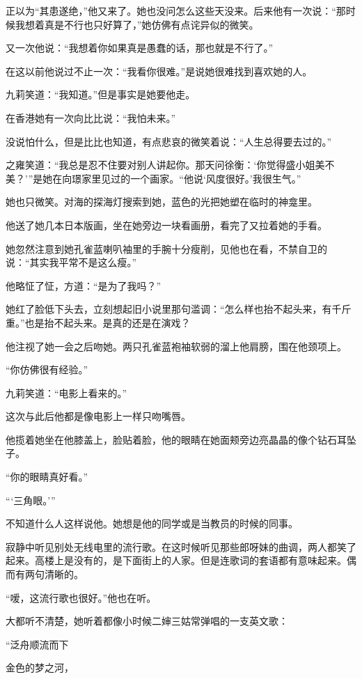 \par 正以为“其患遂绝，”他又来了。她也没问怎么这些天没来。后来他有一次说：“那时候我想着真是不行也只好算了，”她仿佛有点诧异似的微笑。
\par 又一次他说：“我想着你如果真是愚蠢的话，那也就是不行了。”
\par 在这以前他说过不止一次：“我看你很难。”是说她很难找到喜欢她的人。
\par 九莉笑道：“我知道。”但是事实是她要他走。
\par 在香港她有一次向比比说：“我怕未来。”
\par 没说怕什么，但是比比也知道，有点悲哀的微笑着说：“人生总得要去过的。”
\par 之雍笑道：“我总是忍不住要对别人讲起你。那天问徐衡：‘你觉得盛小姐美不美？'”是她在向璟家里见过的一个画家。“他说‘风度很好。’我很生气。”
\par 她也只微笑。对海的探海灯搜索到她，蓝色的光把她塑在临时的神龛里。
\par 他送了她几本日本版画，坐在她旁边一块看画册，看完了又拉着她的手看。
\par 她忽然注意到她孔雀蓝喇叭袖里的手腕十分瘦削，见他也在看，不禁自卫的说：“其实我平常不是这么瘦。”
\par 他略怔了怔，方道：“是为了我吗？”
\par 她红了脸低下头去，立刻想起旧小说里那句滥调：“怎么样也抬不起头来，有千斤重。”也是抬不起头来。是真的还是在演戏？
\par 他注视了她一会之后吻她。两只孔雀蓝袍袖软弱的溜上他肩膀，围在他颈项上。
\par “你仿佛很有经验。”
\par 九莉笑道：“电影上看来的。”
\par 这次与此后他都是像电影上一样只吻嘴唇。
\par 他揽着她坐在他膝盖上，脸贴着脸，他的眼睛在她面颊旁边亮晶晶的像个钻石耳坠子。
\par “你的眼睛真好看。”
\par “‘三角眼。'”
\par 不知道什么人这样说他。她想是他的同学或是当教员的时候的同事。
\par 寂静中听见别处无线电里的流行歌。在这时候听见那些郎呀妹的曲调，两人都笑了起来。高楼上是没有的，是下面街上的人家。但是连歌词的套语都有意味起来。偶而有两句清晰的。
\par “嗳，这流行歌也很好。”他也在听。
\par 大都听不清楚，她听着都像小时候二婶三姑常弹唱的一支英文歌：
\par “泛舟顺流而下
\par 金色的梦之河，
